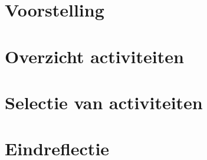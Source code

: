 \documentclass[a4paper]{article}
\begin{document}
  

  \tableofcontents
  \newpage

  \section{Voorstelling}
  
  \section{Overzicht activiteiten}
  
  \section{Selectie van activiteiten}
  
  \section{Eindreflectie}
  
\end{document}
